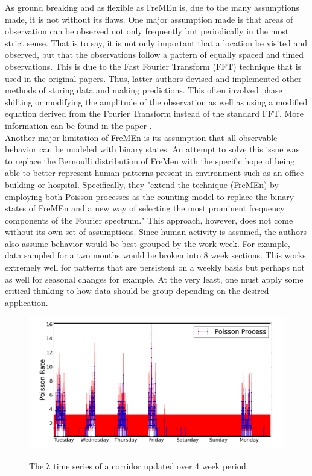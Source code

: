 As ground breaking and as flexible as FreMEn is, due to the many assumptions
made, it is not without its flaws. One major assumption made is that areas of
observation can be observed not only frequently but periodically in the most
strict sense. That is to say, it is not only important that a location be
visited and observed, but that the observations follow a pattern of equally
spaced and timed observations. This is due to the Fast Fourier Transform (FFT)
technique that is used in the original papers. Thus, latter authors devised and
implemented other methods of storing data and making predictions. This often
involved phase shifting or modifying the amplitude of the observation as well
as using a modified equation derived from the Fourier Transform instead of the
standard FFT. More information can be found in the paper \cite{Santos2016}. \\

Another major limitation of FreMEn is its assumption that all observable
behavior can be modeled with binary states. An  attempt to solve this issue
was to replace the Bernoulli distribution of FreMen with the specific hope of
being able to better represent human patterns present in environment such as
an office building or hospital. Specifically, they "extend the technique
(FreMEn) by employing both Poisson processes as the counting model to replace
the binary states of FreMEn and a new way of selecting the most prominent
frequency components of the Fourier spectrum."\cite{Jovan2016} This approach,
however, does not come without its own set of assumptions. Since human
activity is assumed, the authors also assume behavior would be best grouped by
the work week. For example, data sampled for a two months would be broken into
8 week sections. This works extremely well for patterns that are persistent on
a weekly basis but perhaps not as well for seasonal changes for example. At
the very least, one must apply some critical thinking to how data should be
group depending on the desired application.


\begin{figure}[!htb]
  \centering
  \includegraphics[width=\linewidth]{images/poisson-spectral-process.png}
  \caption{The λ time series of a corridor updated over 4 week period.}
  \cite{Jovan2016}
  \label{figure:example}
\end{figure}

